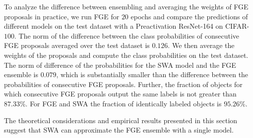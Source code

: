 \documentclass[letterpaper]{article}
\begin{document}
To analyze the difference between ensembling and averaging the weights of
FGE proposals in practice, we run FGE for $20$ epochs and compare the
predictions of different models on the test dataset with a Preactivation
ResNet-164 \citep{he2016deep} on CIFAR-$100$. The norm of the difference
between the class probabilities of consecutive FGE proposals averaged over 
the test 
dataset is $0.126$. We then average the weights of the proposals and compute
the class probabilities on the test dataset. The norm of difference of the probabilities for
the SWA model and the FGE ensemble is $0.079$, which is
substantially smaller than the difference between the probabilities of consecutive
FGE proposals. Further, the fraction of objects for which consecutive FGE proposals 
output the same labels is not greater than $87.33 \%$. For FGE and SWA
the fraction of identically labeled objects is $95.26 \%$.

The theoretical considerations and empirical results presented in this section
suggest that SWA can approximate the FGE ensemble
with a single model.
\end{document}
